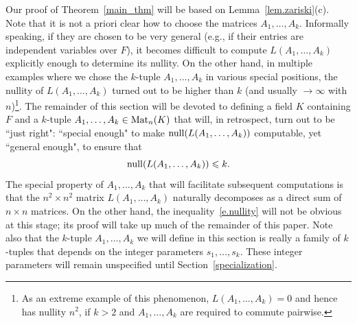 \documentclass{amsproc}
\theoremstyle{definition}
\theoremstyle{remark}
\numberwithin{equation}{section}
\newcommand{\M}{{\rm Mat}}
\newcommand{\nullity}{{\rm null}}
\begin{document}
Our proof of Theorem~\ref{main_thm} will be based on Lemma~\ref{lem.zariski}(c). Note that it is not a priori clear how to choose
the matrices $A_1, \ldots, A_k$. Informally speaking, if they are chosen to be very general (e.g., 
if their entries are independent variables over $F$),
it becomes difficult to compute $L(A_1, \ldots, A_k)$ explicitly 
enough to determine its nullity. On the other hand, in multiple examples where we chose 
the $k$-tuple $A_1, \ldots, A_k$ in various special positions, the nullity of $L(A_1, \ldots, A_k)$
turned out to be higher than $k$ (and usually $\longrightarrow \infty$ with $n$)\footnote{As an extreme example of this phenomenon,
$L(A_1, \ldots, A_k) = 0$ and hence has nullity $n^2$, if $k > 2$ and $A_1, \ldots, A_k$ are required to commute pairwise.}.
The remainder of this section will be devoted to defining a field $K$ containing $F$ and a $k$-tuple $A_1, \ldots, A_k \in \M_n(K)$ 
that will, in retrospect, turn out to be ``just right": ``special enough" to make $\nullity (L(A_1, \ldots, A_k))$ computable,
yet ``general enough", to ensure that 
\begin{equation} \label{e.nullity}
\nullity ( L(A_1, \ldots, A_k) ) \leqslant k.
\end{equation} 
The special property of $A_1, \ldots, A_k$ that will facilitate subsequent computations is that the $n^2 \times n^2$
matrix $L(A_1,\dots,A_k)$ naturally decomposes as a direct sum of $n\times n$ matrices. On the other hand, the inequality~\eqref{e.nullity} 
will not be obvious at this stage; its proof will take up much of the remainder of this paper. Note also that the $k$-tuple
$A_1, \ldots, A_k$ we will define in this section is really a family of $k$-tuples that depends 
on the integer parameters $s_1, \ldots, s_k$. These integer parameters will remain unspecified until 
Section~\ref{specialization}.
\end{document}
